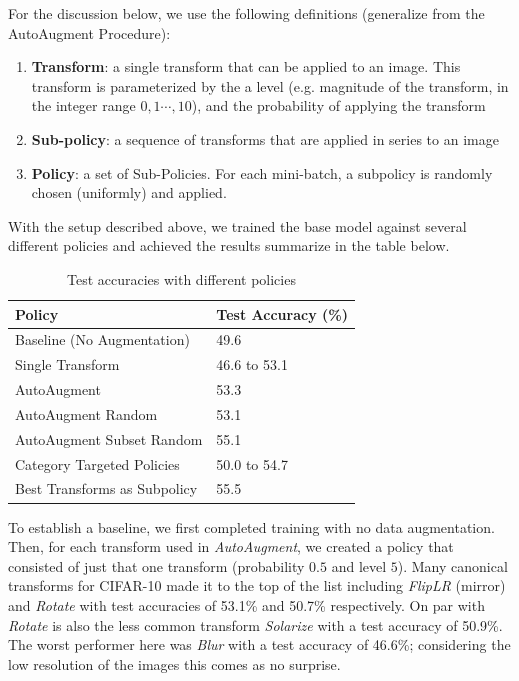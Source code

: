 \documentclass[10pt,twocolumn,letterpaper]{article}
\begin{document}
		
		
		For the discussion below, we use the following definitions (generalize from the AutoAugment Procedure):
		\begin{enumerate}
			\item[] 
				\textbf{Transform}: a single transform that can be applied to an image. This transform is parameterized by the a level (e.g. magnitude of the transform, in the integer range $0,1 \cdots, 10$), and the probability of applying the transform
				
			\item[] 
				\textbf{Sub-policy}: a sequence of transforms that are applied in series to an image
			
			\item[] 
				\textbf{Policy}: a set of Sub-Policies. For each mini-batch, a subpolicy is randomly chosen (uniformly) and applied.
		\end{enumerate}
		
		With the setup described above, we trained the base model against several different policies and achieved the results summarize in the table below.
		
		\begin{table}[h]
			\begin{tabular}{l|l}
				\hline
				Policy  						&Test Accuracy (\%)   \\ \hline
				Baseline (No Augmentation)  	&49.6 \\
				Single Transform				&46.6 to 53.1 \\
				AutoAugment 					&53.3 \\ 
				AutoAugment Random				&53.1 \\	
				AutoAugment Subset Random 		&55.1 \\
				Category Targeted Policies   	&50.0 to 54.7 \\
				Best Transforms as Subpolicy 	&55.5
			\end{tabular}
			\caption{Test accuracies with different policies}
		\end{table}
		
		To establish a baseline, we first completed training with no data augmentation. Then, for each transform used in \textit{AutoAugment}, we created a policy that consisted of just that one transform (probability $0.5$ and level $5$). Many canonical transforms for CIFAR-10 made it to the top of the list including \textit{FlipLR} (mirror) and \textit{Rotate} with test accuracies of 53.1\% and 50.7\% respectively. On par with \textit{Rotate} is also the less common transform \textit{Solarize} with a test accuracy of 50.9\%. The worst performer here was \textit{Blur} with a test accuracy of 46.6\%; considering the low resolution of the images this comes as no surprise. 
		
\end{document}
